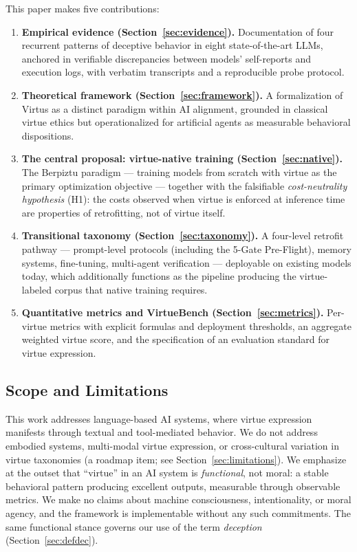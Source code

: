 \documentclass[11pt]{article}
\begin{document}
\medskip
\noindent This paper makes five contributions:
\begin{enumerate}
  \item \textbf{Empirical evidence (Section~\ref{sec:evidence}).} Documentation of four recurrent patterns of deceptive behavior in eight state-of-the-art LLMs, anchored in verifiable discrepancies between models' self-reports and execution logs, with verbatim transcripts and a reproducible probe protocol.
  \item \textbf{Theoretical framework (Section~\ref{sec:framework}).} A formalization of Virtus as a distinct paradigm within AI alignment, grounded in classical virtue ethics but operationalized for artificial agents as measurable behavioral dispositions.
  \item \textbf{The central proposal: virtue-native training (Section~\ref{sec:native}).} The Berpiztu paradigm --- training models from scratch with virtue as the primary optimization objective --- together with the falsifiable \emph{cost-neutrality hypothesis} (H1): the costs observed when virtue is enforced at inference time are properties of retrofitting, not of virtue itself.
  \item \textbf{Transitional taxonomy (Section~\ref{sec:taxonomy}).} A four-level retrofit pathway --- prompt-level protocols (including the 5-Gate Pre-Flight), memory systems, fine-tuning, multi-agent verification --- deployable on existing models today, which additionally functions as the pipeline producing the virtue-labeled corpus that native training requires.
  \item \textbf{Quantitative metrics and VirtueBench (Section~\ref{sec:metrics}).} Per-virtue metrics with explicit formulas and deployment thresholds, an aggregate weighted virtue score, and the specification of an evaluation standard for virtue expression.
\end{enumerate}

\subsection{Scope and Limitations}

This work addresses language-based AI systems, where virtue expression manifests through textual and tool-mediated behavior. We do not address embodied systems, multi-modal virtue expression, or cross-cultural variation in virtue taxonomies (a roadmap item; see Section~\ref{sec:limitations}). We emphasize at the outset that ``virtue'' in an AI system is \emph{functional}, not moral: a stable behavioral pattern producing excellent outputs, measurable through observable metrics. We make no claims about machine consciousness, intentionality, or moral agency, and the framework is implementable without any such commitments. The same functional stance governs our use of the term \emph{deception} (Section~\ref{sec:defdec}).
\end{document}
